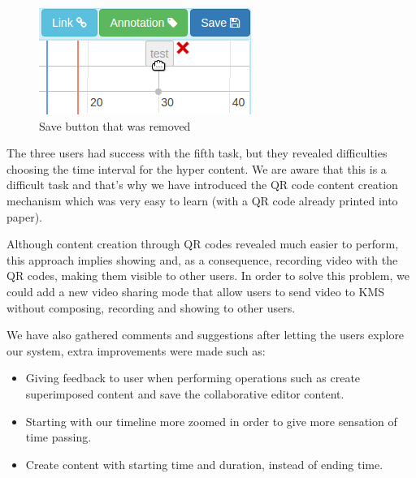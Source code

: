 \begin{figure}
\centering
\begin{minipage}[b]{0.3\linewidth}
\centering

    \includegraphics[width=\textwidth]{figures/test_ui_05.png}
\end{minipage}


    \caption{Save button that was removed}
    \label{fig:test_ui_05}
\end{figure}

The three users had success with the fifth task, but they revealed difficulties choosing the time interval for the hyper content. We are aware that this is a difficult task and that's why we have introduced the \ac{QR} code content creation mechanism which was very easy to learn (with a \ac{QR} code already printed into paper).

Although content creation through \ac{QR} codes revealed much easier to perform, this approach implies showing and, as a consequence, recording video with the \ac{QR} codes, making them visible to other users. In order to solve this problem, we could add a new video sharing mode that allow users to send video to \ac{KMS} without composing, recording and showing to other users.

We have also gathered comments and suggestions after letting the users explore our system, extra improvements were made such as:

\begin{itemize}
\item Giving feedback to user when performing operations such as create superimposed content and save the collaborative editor content.
\item Starting with our timeline more zoomed in order to give more sensation of time passing.
\item Create content with starting time and duration, instead of ending time.
\end{itemize}

